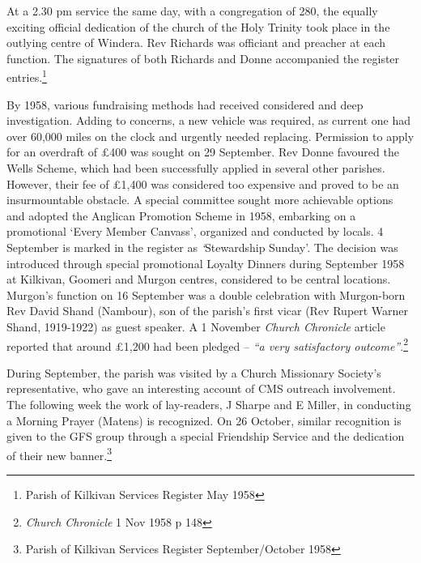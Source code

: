 At a 2.30 pm service the same day, with a congregation of 280, the equally exciting official dedication of the church of the Holy Trinity took place in the outlying centre of Windera. Rev Richards was officiant and preacher at each function. The signatures of both Richards and Donne accompanied the register entries.\footnote{Parish of Kilkivan Services Register May 1958}


By 1958, various fundraising methods had received considered and deep investigation. Adding to concerns, a new vehicle was required, as current one had over 60,000 miles on the clock and urgently needed replacing. Permission to apply for an overdraft of \pounds400 was sought on 29 September. Rev Donne favoured the Wells Scheme, which had been successfully applied in several other parishes. However, their fee of \pounds1,400 was considered too expensive and proved to be an insurmountable obstacle. A special committee sought more achievable options and adopted the Anglican Promotion Scheme in 1958, embarking on a promotional `Every Member Canvass', organized and conducted by locals. 4 September is marked in the register as \emph{`}Stewardship Sunday'. The decision was introduced through special promotional Loyalty Dinners during September 1958 at Kilkivan, Goomeri and Murgon centres, considered to be central locations. Murgon's function on 16 September was a double celebration with Murgon-born Rev David Shand (Nambour), son of the parish's first vicar (Rev Rupert Warner Shand, 1919-1922) as guest speaker. A 1 November \emph{Church Chronicle} article reported that around \pounds1,200 had been pledged -- \emph{``a very satisfactory outcome''}.\footnote{\emph{Church Chronicle} 1 Nov 1958 p 148}


During September, the parish was visited by a Church Missionary Society's representative, who gave an interesting account of CMS outreach involvement. The following week the work of lay-readers, J Sharpe and E Miller, in conducting a Morning Prayer (Matens) is recognized. On 26 October, similar recognition is given to the GFS group through a special Friendship Service and the dedication of their new banner.\footnote{Parish of Kilkivan Services Register September/October 1958}








